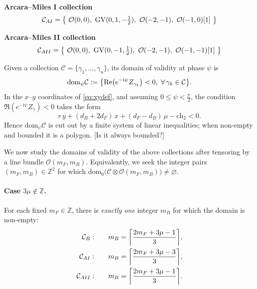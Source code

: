 \documentclass[11pt, a4paper]{article}
\newcommand{\ii}{\mathrm{i}}
\newcommand{\ch}{\mathrm{ch}}
\newcommand{\chO}{\mathcal{O}}
\newcommand{\GV}{\mathrm{GV}}
\newcommand{\remark}[1]{\textcolor{RemarkColor}{[#1]}}
\DeclarePairedDelimiter{\ceil}{\lceil}{\rceil}
\numberwithin{equation}{section}
\begin{document}
\noindent\textbf{Arcara--Miles I collection}
\begin{equation}
  \mathcal{C}_{AI}
  = \qty{\ \chO(0,0),\ \GV(0,1,-\tfrac12),\ \chO(-2,-1),\ \chO(-1,0)[1]\ }
\end{equation}

\noindent\textbf{Arcara--Miles II collection}
\begin{equation}
  \mathcal{C}_{AII}
  = \qty{\ \chO(0,0),\ \GV(0,-1,\tfrac12),\ \chO(-2,-1),\ \chO(-1,-1)[1]\ }
\end{equation}

Given a collection $\mathcal{C}=\{\gamma_1,\ldots,\gamma_n\}$, its domain of validity at phase $\psi$ is
\begin{equation}
  \mathrm{dom}_\psi \mathcal{C}
  := \qty{ \Re\!\big(e^{-\ii\psi} Z_{\gamma_k}\big) < 0,\ \forall\,\gamma_k\in\mathcal{C} }.
\end{equation}
In the $x$--$y$ coordinates of \cref{eq:xydef}, and assuming $0\le \psi < \frac{\pi}{2}$, the condition
$\Re(e^{-\ii\psi}Z_\gamma)<0$ takes the form
\begin{equation}
  r\,y + (d_B+2d_F)\,x + (d_F-d_B)\,\mu - \ch_2 < 0.
\end{equation}
Hence $\mathrm{dom}_\psi \mathcal{C}$ is cut out by a finite system of linear inequalities; when non-empty and bounded it is a polygon. \remark{Is it always bounded?}

\medskip
We now study the domains of validity of the above collections after tensoring by a line bundle $\chO(m_F,m_B)$.
Equivalently, we seek the integer pairs $(m_F,m_B)\in\mathbb{Z}^2$ for which
\(
\mathrm{dom}_0\!\big(\mathcal{C}\otimes \chO(m_F,m_B)\big)\neq\varnothing.
\)

\paragraph{Case $3\mu\notin\mathbb{Z}$.}
For each fixed $m_F\in\mathbb{Z}$, there is \emph{exactly one} integer $m_B$ for which the domain is non-empty:
\begin{align}
  \mathcal{C}_B: \qquad  & m_B = \ceil*{\frac{2m_F + 3\mu - 1}{3}},\\
  \mathcal{C}_{AI}: \qquad & m_B = \ceil*{\frac{2m_F + 3\mu - 3}{3}},\\
  \mathcal{C}_{AII}: \qquad & m_B = \ceil*{\frac{2m_F + 3\mu - 1}{3}}.
\end{align}
\end{document}
